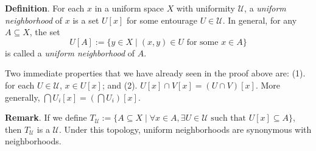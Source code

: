 \documentclass[12pt]{article}
\begin{document}
\textbf{Definition}.  For each $x$ in a uniform space $X$ with uniformity $\mathcal{U}$, a \emph{uniform neighborhood} of $x$ is a set $U[x]$ for some entourage $U\in\mathcal{U}$.  In general, for any $A\subseteq X$, the set $$U[A]:=\lbrace y \in X \mid (x,y)\in U\mbox{ for some }x\in A\rbrace $$ is called a \emph{uniform neighborhood} of $A$.

Two immediate properties that we have already seen in the proof above are: (1). for each $U\in\mathcal{U}$, $x\in U[x]$; and (2). $U[x]\cap V[x]=(U\cap V)[x]$.  More generally, $\bigcap U_i[x]=(\bigcap U_i)[x]$.

\textbf{Remark}.  If we define $T_{\mathcal{U}}:=\lbrace A\subseteq X\mid \forall x\in A, \exists U\in \mathcal{U}\mbox{ such that }U[x]\subseteq A\rbrace$, then $T_{\mathcal{U}}$ is a  $\mathcal{U}$.  Under this topology, uniform neighborhoods are synonymous with neighborhoods.

\end{document}
